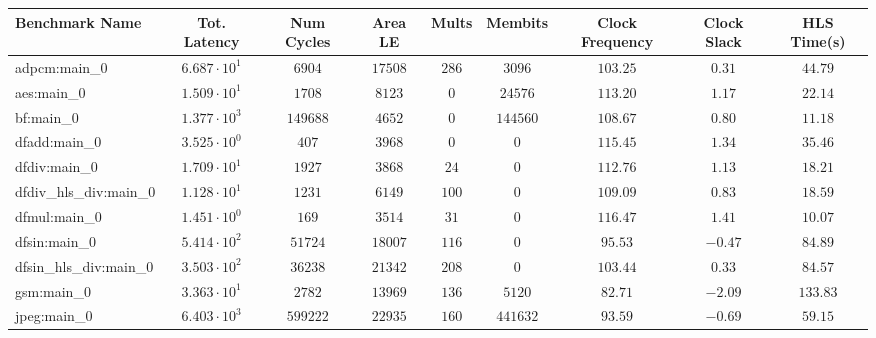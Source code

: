 \begin{tabular}{|l|c|c|c|c|c|c|c|c|}
\hline
Benchmark Name          & Tot. Latency           & Num Cycles & Area LE    & Mults    & Membits    & Clock Frequency & Clock Slack & HLS Time(s) \\
\hline
adpcm:main\_0           & $ 6.687 \cdot 10^{1} $ & $ 6904   $ & $ 17508  $ & $ 286  $ & $ 3096   $ & $ 103.25      $ & $ 0.31    $ & $ 44.79   $ \\
aes:main\_0             & $ 1.509 \cdot 10^{1} $ & $ 1708   $ & $ 8123   $ & $ 0    $ & $ 24576  $ & $ 113.20      $ & $ 1.17    $ & $ 22.14   $ \\
bf:main\_0              & $ 1.377 \cdot 10^{3} $ & $ 149688 $ & $ 4652   $ & $ 0    $ & $ 144560 $ & $ 108.67      $ & $ 0.80    $ & $ 11.18   $ \\
dfadd:main\_0           & $ 3.525 \cdot 10^{0} $ & $ 407    $ & $ 3968   $ & $ 0    $ & $ 0      $ & $ 115.45      $ & $ 1.34    $ & $ 35.46   $ \\
dfdiv:main\_0           & $ 1.709 \cdot 10^{1} $ & $ 1927   $ & $ 3868   $ & $ 24   $ & $ 0      $ & $ 112.76      $ & $ 1.13    $ & $ 18.21   $ \\
dfdiv\_hls\_div:main\_0 & $ 1.128 \cdot 10^{1} $ & $ 1231   $ & $ 6149   $ & $ 100  $ & $ 0      $ & $ 109.09      $ & $ 0.83    $ & $ 18.59   $ \\
dfmul:main\_0           & $ 1.451 \cdot 10^{0} $ & $ 169    $ & $ 3514   $ & $ 31   $ & $ 0      $ & $ 116.47      $ & $ 1.41    $ & $ 10.07   $ \\
dfsin:main\_0           & $ 5.414 \cdot 10^{2} $ & $ 51724  $ & $ 18007  $ & $ 116  $ & $ 0      $ & $ 95.53       $ & $ -0.47   $ & $ 84.89   $ \\
dfsin\_hls\_div:main\_0 & $ 3.503 \cdot 10^{2} $ & $ 36238  $ & $ 21342  $ & $ 208  $ & $ 0      $ & $ 103.44      $ & $ 0.33    $ & $ 84.57   $ \\
gsm:main\_0             & $ 3.363 \cdot 10^{1} $ & $ 2782   $ & $ 13969  $ & $ 136  $ & $ 5120   $ & $ 82.71       $ & $ -2.09   $ & $ 133.83  $ \\
jpeg:main\_0            & $ 6.403 \cdot 10^{3} $ & $ 599222 $ & $ 22935  $ & $ 160  $ & $ 441632 $ & $ 93.59       $ & $ -0.69   $ & $ 59.15   $ \\

\end{tabular}
